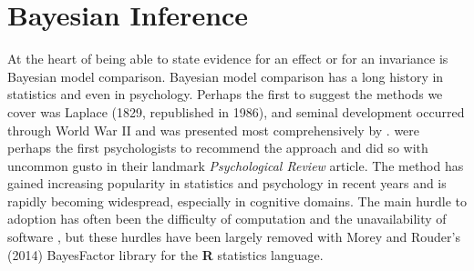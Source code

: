 \documentclass[man]{apa6}
\begin{document}
\section{Bayesian Inference}
At the heart of being able to state evidence for an effect or for an invariance is Bayesian model comparison.  Bayesian model comparison has a long history in statistics and even in psychology.  Perhaps the first to suggest the methods we cover was Laplace (1829, republished in 1986), and seminal development occurred through World War II and was presented most comprehensively by \citet{Jeffreys:1961}.  \citet{Edwards:etal:1963} were perhaps the first psychologists to recommend the approach and did so with uncommon gusto in their landmark {\em Psychological Review} article.  The method has gained increasing popularity in statistics and psychology in recent years \citep{Berger:Delampady:1987,Gallistel:2009,Raftery:1995,Rouder:etal:2009a,Wagenmakers:2007} and is rapidly becoming widespread, especially in cognitive domains. The main hurdle to adoption has often been the difficulty of computation and the unavailability of software \citep{Gallistel:2009}, but these hurdles have been largely removed with Morey and Rouder's (2014) BayesFactor library for the {\bf R} statistics language.

\nocite{Laplace:1986,Morey:Rouder:2014}
\end{document}
